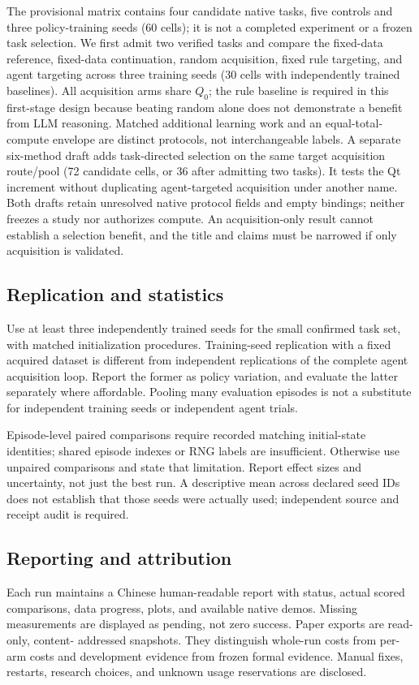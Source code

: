 \documentclass[10pt,twocolumn,letterpaper]{article}
\begin{document}
The provisional matrix contains four candidate native tasks, five controls and
three policy-training seeds (60 cells); it is not a completed experiment or a
frozen task selection. We first admit two verified tasks and compare the fixed-data
reference, fixed-data continuation, random acquisition, fixed rule targeting, and
agent targeting across three training seeds (30 cells with independently trained
baselines). All acquisition arms share $Q_0$; the rule baseline is required in this
first-stage design because beating random alone does not demonstrate a benefit
from LLM reasoning. Matched additional learning work and an equal-total-compute
envelope are distinct protocols, not interchangeable labels.
A separate six-method draft adds task-directed selection on the same target
acquisition route/pool (72 candidate cells, or 36 after admitting two tasks).
It tests the Qt increment without duplicating agent-targeted acquisition under
another name. Both drafts retain unresolved native protocol fields and empty
bindings; neither freezes a study nor authorizes compute. An acquisition-only
result cannot establish a selection benefit, and the title and claims must be
narrowed if only acquisition is validated.

\subsection{Replication and statistics}
Use at least three independently trained seeds for the small confirmed task set,
with matched initialization procedures. Training-seed replication with a fixed
acquired dataset is different from independent replications of the complete agent
acquisition loop. Report the former as policy variation, and evaluate the latter
separately where affordable. Pooling many evaluation episodes is not a substitute
for independent training seeds or independent agent trials.

Episode-level paired comparisons require recorded matching initial-state identities;
shared episode indexes or RNG labels are insufficient. Otherwise use unpaired
comparisons and state that limitation. Report effect sizes and uncertainty, not
just the best run. A descriptive mean across declared seed IDs does not establish
that those seeds were actually used; independent source and receipt audit is required.

\subsection{Reporting and attribution}
Each run maintains a Chinese human-readable report with status, actual scored
comparisons, data progress, plots, and available native demos. Missing measurements
are displayed as pending, not zero success. Paper exports are read-only, content-
addressed snapshots. They distinguish whole-run costs from per-arm costs and
development evidence from frozen formal evidence. Manual fixes, restarts,
research choices, and unknown usage reservations are disclosed.
\end{document}

